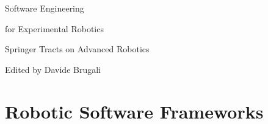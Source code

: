 \documentclass{svmult}
\begin{document}
\frontmatter%

\thispagestyle{empty} \vspace*{3.5cm}
\begin{center}

{\huge Software Engineering}

\vspace*{0.5cm}

{\huge for Experimental Robotics}

\vspace*{3.5cm}

{\large Springer Tracts on Advanced Robotics}

\vspace*{1.5cm}

{\large Edited by Davide Brugali}


\end{center}

\mainmatter%
\part{Robotic Software Frameworks}








\backmatter%




\appendix

\printindex

\end{document}
